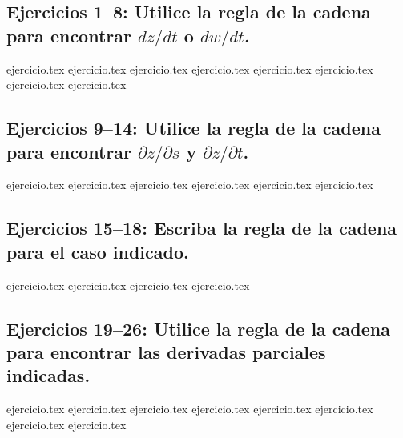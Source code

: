 
\subsection*{Ejercicios 1--8: Utilice la regla de la cadena para encontrar $dz/dt$ o $dw/dt$.}
\begin{enumerate}
    {ejercicio.tex}
    {ejercicio.tex}
    {ejercicio.tex}
    {ejercicio.tex}
    {ejercicio.tex}
    {ejercicio.tex}
    {ejercicio.tex}
    {ejercicio.tex}
\end{enumerate}

\subsection*{Ejercicios 9--14: Utilice la regla de la cadena para encontrar $\partial z/\partial s$ y $\partial z/\partial t$.}
\begin{enumerate}
    \setcounter{enumi}{8}
    {ejercicio.tex}
    {ejercicio.tex}
    {ejercicio.tex}
    {ejercicio.tex}
    {ejercicio.tex}
    {ejercicio.tex}
\end{enumerate}

\subsection*{Ejercicios 15--18: Escriba la regla de la cadena para el caso indicado.}
\begin{enumerate}
    \setcounter{enumi}{14}
    {ejercicio.tex}
    {ejercicio.tex}
    {ejercicio.tex}
    {ejercicio.tex}
\end{enumerate}

\subsection*{Ejercicios 19--26: Utilice la regla de la cadena para encontrar las derivadas parciales indicadas.}
\begin{enumerate}
    \setcounter{enumi}{18}
    {ejercicio.tex}
    {ejercicio.tex}
    {ejercicio.tex}
    {ejercicio.tex}
    {ejercicio.tex}
    {ejercicio.tex}
    {ejercicio.tex}
    {ejercicio.tex}
\end{enumerate}


